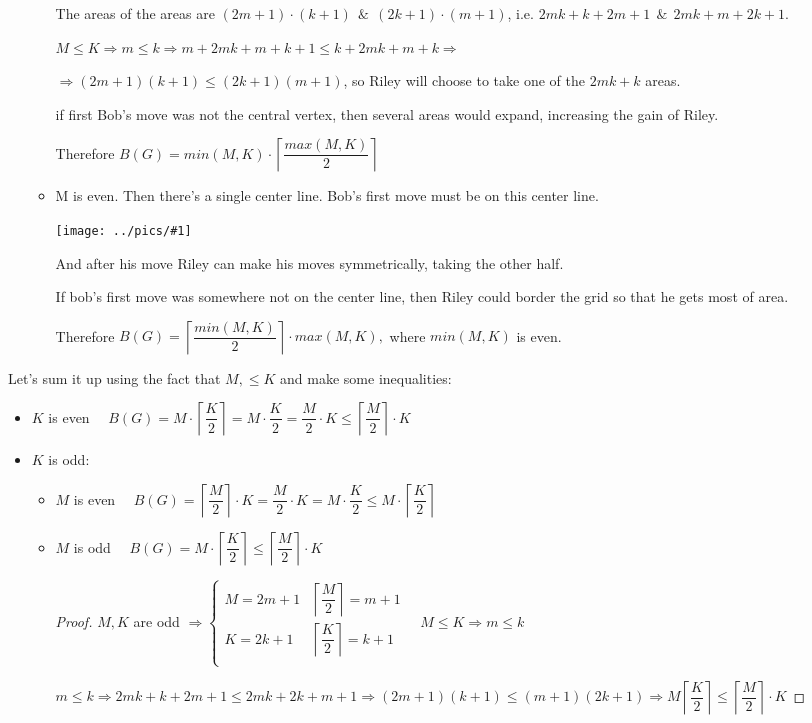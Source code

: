 \documentclass[12pt,a4paper, flushleft]{article}
\newcommand{\gr}[1]{\texttt{[image: ../pics/\#1]}}
\newcommand{\ceil}[1]{\left\lceil #1 \right\rceil}
\begin{document}
\begin{itemize}
\begin{itemize}
			The areas of the areas are $(2m+1)\cdot (k+1) ~~\&~~ (2k+1)\cdot (m+1)$, i.e. $2mk+k + 2m + 1~~\&~~ 2mk + m + 2k + 1$. 
			
			$M\leqslant K\Rightarrow m\leqslant k\Rightarrow m + 2mk + m + k + 1\leqslant  k + 2mk + m + k\Rightarrow $
			
			$\Rightarrow (2m+1)(k+1)\leqslant (2k+1)(m+1)$, so Riley will choose to take one of the $2mk + k$ areas. 
			
			if first Bob's move was not the central vertex, then several areas would expand, increasing the gain of Riley.
			
			Therefore $B(G) = min(M, K)\cdot \ceil{\dfrac{max(M, K)}{2}}$
			
			\item M is even. Then there's a single center line. Bob's first move must be on this center line.
			
			\gr{b3}
			
			And after his move Riley can make his moves symmetrically, taking the other half.
			
			If bob's first move was somewhere not on the center line, then Riley could border the grid so that he gets most of area.
			
			Therefore $B(G) = \ceil{\dfrac{min(M, K)}{2}}\cdot max(M, K),$ where $min(M, K)$ is even.
		\end{itemize}
	\end{itemize}
	
	
	
	Let's sum it up using the fact that $M,\leqslant K$ and make some inequalities:
	\begin{itemize}
		\item $K$ is even $\quad B(G) = M \cdot \ceil{\dfrac{K}{2}} = M\cdot \dfrac{K}{2}  = \dfrac{M}{2}\cdot K\leqslant \ceil{\dfrac{M}{2}}\cdot K$
		\item $K$ is odd:
		\begin{itemize}
			\item $M$ is even $\quad B(G) = \ceil{\dfrac{M}{2}}\cdot K = \dfrac{M}{2}\cdot K = M\cdot \dfrac{K}{2}\leqslant M\cdot \ceil{\dfrac{K}{2}}$	
			\item $M$ is odd $\quad B(G) = M\cdot \ceil{\dfrac{K}{2}}\leqslant \ceil{\dfrac{M}{2}}\cdot K$
			\begin{proof}
				$M, K$ are odd $\Rightarrow \begin{cases} M = 2m+1 & \ceil{\dfrac{M}{2}} = m+1\\K = 2k+1& \ceil{\dfrac{K}{2}} = k+1\\ \end{cases}\quad M\leqslant K\Rightarrow m\leqslant k$
				
				$m\leqslant k\Rightarrow 2mk + k + 2m + 1\leqslant 2mk + 2k + m + 1\Rightarrow (2m+1)(k+1)\leqslant (m+1)(2k+1) \Rightarrow M\ceil{\dfrac{K}{2}}\leqslant \ceil{\dfrac{M}{2}}\cdot K$
			\end{proof}
		\end{itemize}		 
	\end{itemize}
	
\end{document}
